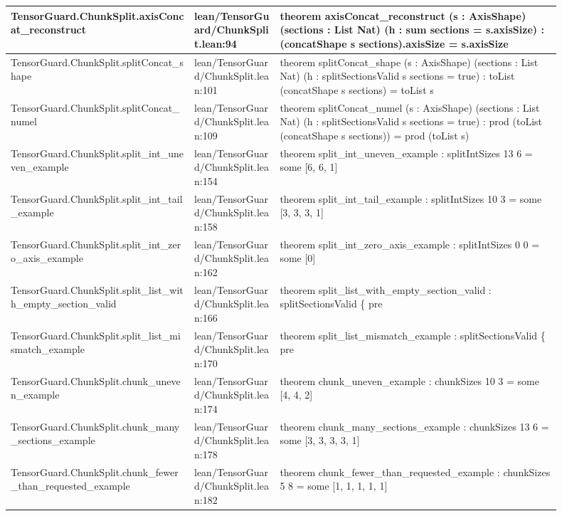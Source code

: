 \documentclass[10pt]{article}
\begin{document}
\begin{longtable}{|p{0.30\linewidth}|p{0.14\linewidth}|p{0.46\linewidth}|}
\hline
TensorGuard.ChunkSplit.axisConcat\_reconstruct & lean/TensorGuard/ChunkSplit.lean:94 & theorem axisConcat\_reconstruct (s : AxisShape) (sections : List Nat) (h : sum sections = s.axisSize) : (concatShape s sections).axisSize = s.axisSize \\
\hline
TensorGuard.ChunkSplit.splitConcat\_shape & lean/TensorGuard/ChunkSplit.lean:101 & theorem splitConcat\_shape (s : AxisShape) (sections : List Nat) (h : splitSectionsValid s sections = true) : toList (concatShape s sections) = toList s \\
\hline
TensorGuard.ChunkSplit.splitConcat\_numel & lean/TensorGuard/ChunkSplit.lean:109 & theorem splitConcat\_numel (s : AxisShape) (sections : List Nat) (h : splitSectionsValid s sections = true) : prod (toList (concatShape s sections)) = prod (toList s) \\
\hline
TensorGuard.ChunkSplit.split\_int\_uneven\_example & lean/TensorGuard/ChunkSplit.lean:154 & theorem split\_int\_uneven\_example : splitIntSizes 13 6 = some [6, 6, 1] \\
\hline
TensorGuard.ChunkSplit.split\_int\_tail\_example & lean/TensorGuard/ChunkSplit.lean:158 & theorem split\_int\_tail\_example : splitIntSizes 10 3 = some [3, 3, 3, 1] \\
\hline
TensorGuard.ChunkSplit.split\_int\_zero\_axis\_example & lean/TensorGuard/ChunkSplit.lean:162 & theorem split\_int\_zero\_axis\_example : splitIntSizes 0 0 = some [0] \\
\hline
TensorGuard.ChunkSplit.split\_list\_with\_empty\_section\_valid & lean/TensorGuard/ChunkSplit.lean:166 & theorem split\_list\_with\_empty\_section\_valid : splitSectionsValid \{ pre \\
\hline
TensorGuard.ChunkSplit.split\_list\_mismatch\_example & lean/TensorGuard/ChunkSplit.lean:170 & theorem split\_list\_mismatch\_example : splitSectionsValid \{ pre \\
\hline
TensorGuard.ChunkSplit.chunk\_uneven\_example & lean/TensorGuard/ChunkSplit.lean:174 & theorem chunk\_uneven\_example : chunkSizes 10 3 = some [4, 4, 2] \\
\hline
TensorGuard.ChunkSplit.chunk\_many\_sections\_example & lean/TensorGuard/ChunkSplit.lean:178 & theorem chunk\_many\_sections\_example : chunkSizes 13 6 = some [3, 3, 3, 3, 1] \\
\hline
TensorGuard.ChunkSplit.chunk\_fewer\_than\_requested\_example & lean/TensorGuard/ChunkSplit.lean:182 & theorem chunk\_fewer\_than\_requested\_example : chunkSizes 5 8 = some [1, 1, 1, 1, 1] \\

\end{longtable}
\end{document}
